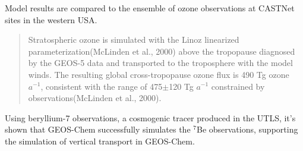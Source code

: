 Model results are compared to the ensemble of ozone observations at CASTNet sites in the western USA.

\begin{quote}
Stratospheric ozone is simulated with the Linoz linearized parameterization(McLinden et al., 2000) above the tropopause diagnosed by the GEOS-5 data and transported to the troposphere with the model winds. The resulting global cross-tropopause ozone flux is 490 Tg ozone $a^{−1}$, consistent with the range of 475$\pm$120 Tg $a^{−1}$ constrained by observations(McLinden et al., 2000).
\end{quote}

Using beryllium-7 observations, a cosmogenic tracer produced in the UTLS, it's shown that GEOS-Chem successfully simulates the $^7$Be observations, supporting the simulation of vertical transport in GEOS-Chem.

  